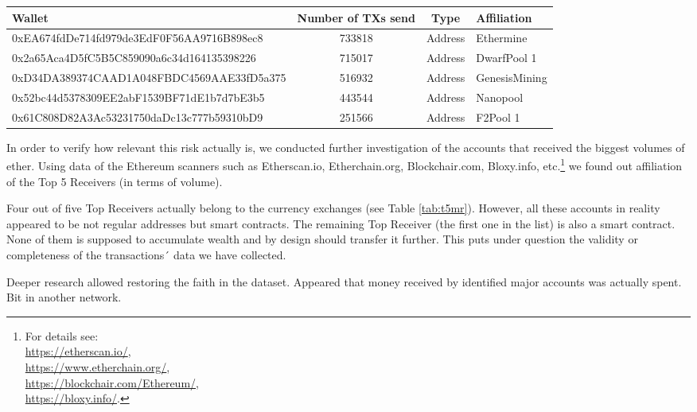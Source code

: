 \begin{table}
\centering
{}
\label{tab:t5ms}
\begin{adjustbox}{width=0.9\linewidth}
\begin{tabular}{p{7cm}ccl}
  \hline
Wallet & Number of TXs send & Type & Affiliation \\
  \hline
  0xEA674fdDe714fd979de3EdF0F56AA9716B898ec8 & 733818 & Address & Ethermine \\
  0x2a65Aca4D5fC5B5C859090a6c34d164135398226 & 715017 & Address & DwarfPool 1 \\
  0xD34DA389374CAAD1A048FBDC4569AAE33fD5a375 & 516932 & Address & GenesisMining \\
  0x52bc44d5378309EE2abF1539BF71dE1b7d7bE3b5 & 443544 & Address & Nanopool \\
  0x61C808D82A3Ac53231750daDc13c777b59310bD9 & 251566 & Address & F2Pool 1 \\
   \hline
\end{tabular}
\end{adjustbox}
\end{table}

In order to verify how relevant this risk actually is, we conducted further investigation of the accounts that received the biggest volumes of ether.  
Using data of the Ethereum scanners such as Etherscan.io, Etherchain.org, Blockchair.com, Bloxy.info, etc.\footnote{For details see: \\ \url{https://etherscan.io/}, \\ \url{https://www.etherchain.org/}, \\ \url{https://blockchair.com/Ethereum/}, \\ \url{https://bloxy.info/}.} we found out affiliation of the Top 5 Receivers (in terms of volume).

Four out of five Top Receivers actually belong to the currency exchanges (see Table \ref{tab:t5mr}).
However, all these accounts in reality appeared to be not regular addresses but smart contracts.
The remaining Top Receiver (the first one in the list) is also a smart contract.
None of them is supposed to accumulate wealth and by design should transfer it further.
This puts under question the validity or completeness of the transactions´ data we have collected.

Deeper research allowed restoring the faith in the dataset.
Appeared that money received by identified major accounts was actually spent.
Bit in another network.

